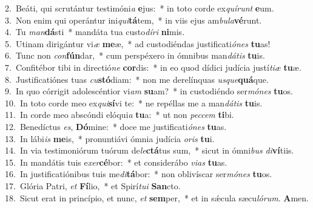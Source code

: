 {2.~}Beáti, qui scrutántur testimóni\textit{a} \textbf{e}jus:~* in toto corde ex\textit{quí}\textit{runt} \textbf{e}um.\\
{3.~}Non enim qui operántur ini\textit{qui}\textbf{tá}tem,~* in viis ejus am\textit{bu}\textit{la}\textbf{vé}runt.\\
{4.~}Tu \textit{man}\textbf{dá}sti~* mandáta tua custo\textit{dí}\textit{ri} \textbf{ni}mis.\\
{5.~}Utinam dirigántur vi\textit{æ} \textbf{me}æ,~* ad custodiéndas justificati\textit{ó}\textit{nes} \textbf{tu}as!\\
{6.~}Tunc non \textit{con}\textbf{fún}dar,~* cum perspéxero in ómnibus man\textit{dá}\textit{tis} \textbf{tu}is.\\
{7.~}Confitébor tibi in directió\textit{ne} \textbf{cor}dis:~* in eo quod dídici judícia justí\textit{ti}\textit{æ} \textbf{tu}æ.\\
{8.~}Justificatiónes tuas \textit{cu}\textbf{stó}diam:~* non me derelínquas \textit{us}\textit{que}\textbf{quá}que.\\
{9.~}In quo córrigit adolescéntior vi\textit{am} \textbf{su}am?~* in custodiéndo ser\textit{mó}\textit{nes} \textbf{tu}os.\\
{10.~}In toto corde meo ex\textit{qui}\textbf{sí}vi te:~* ne repéllas me a man\textit{dá}\textit{tis} \textbf{tu}is.\\
{11.~}In corde meo abscóndi elóqui\textit{a} \textbf{tu}a:~* ut non \textit{pec}\textit{cem} \textbf{ti}bi.\\
{12.~}Benedíctus \textit{es}, \textbf{Dó}mine:~* doce me justificati\textit{ó}\textit{nes} \textbf{tu}as.\\
{13.~}In lábi\textit{is} \textbf{me}is,~* pronuntiávi ómnia judícia \textit{o}\textit{ris} \textbf{tu}i.\\
{14.~}In via testimoniórum tuórum de\textit{le}\textbf{ctá}tus sum,~* sicut in ómni\textit{bus} \textit{di}\textbf{ví}tiis.\\
{15.~}In mandátis tuis e\textit{xer}\textbf{cé}bor:~* et considerábo \textit{vi}\textit{as} \textbf{tu}as.\\
{16.~}In justificatiónibus tuis me\textit{di}\textbf{tá}bor:~* non oblivíscar ser\textit{mó}\textit{nes} \textbf{tu}os.\\
{17.~}Glória Patri, \textit{et} \textbf{Fí}lio,~* et Spirí\textit{tu}\textit{i} \textbf{San}cto.\\
{18.~}Sicut erat in princípio, et nunc, \textit{et} \textbf{sem}per,~* et in sǽcula sæcu\textit{ló}\textit{rum}. \textbf{A}men.\\
